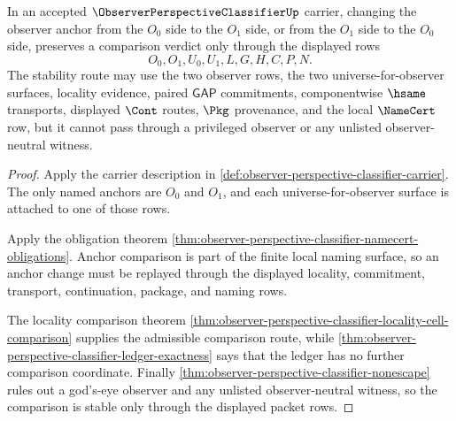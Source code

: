 \begin{theorem}
\label{thm:observer-perspective-classifier-anchor-change-stability}
In an accepted $\ObserverPerspectiveClassifierUp$ carrier, changing the observer anchor from the $O_0$ side to the $O_1$ side, or from the $O_1$ side to the $O_0$ side, preserves a comparison verdict only through the displayed rows
$$
O_0,O_1,U_0,U_1,L,G,H,C,P,N.
$$
The stability route may use the two observer rows, the two universe-for-observer surfaces, locality evidence, paired $\mathsf{GAP}$ commitments, componentwise $\hsame$ transports, displayed $\Cont$ routes, $\Pkg$ provenance, and the local $\NameCert$ row, but it cannot pass through a privileged observer or any unlisted observer-neutral witness.
\end{theorem}
\begin{proof}
Apply the carrier description in \autoref{def:observer-perspective-classifier-carrier}. The only named anchors are $O_0$ and $O_1$, and each universe-for-observer surface is attached to one of those rows.

Apply the obligation theorem \autoref{thm:observer-perspective-classifier-namecert-obligations}. Anchor comparison is part of the finite local naming surface, so an anchor change must be replayed through the displayed locality, commitment, transport, continuation, package, and naming rows.

The locality comparison theorem \autoref{thm:observer-perspective-classifier-locality-cell-comparison} supplies the admissible comparison route, while \autoref{thm:observer-perspective-classifier-ledger-exactness} says that the ledger has no further comparison coordinate. Finally \autoref{thm:observer-perspective-classifier-nonescape} rules out a god's-eye observer and any unlisted observer-neutral witness, so the comparison is stable only through the displayed packet rows.
\end{proof}


